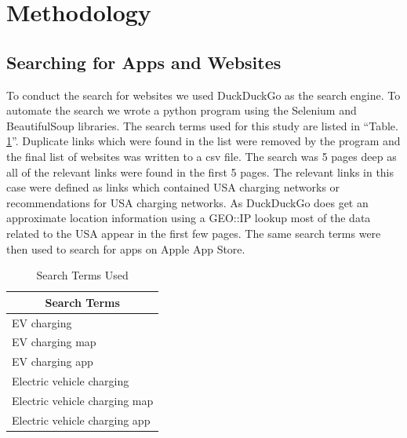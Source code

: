\documentclass[conference]{IEEEtran}
\begin{document}
\section{Methodology}

\subsection{Searching for Apps and Websites}
To conduct the search for websites we used DuckDuckGo as the search engine. To automate the search we wrote a python program using the Selenium and BeautifulSoup libraries. The search terms used for this study are listed in ``Table. \ref{tab0}''. Duplicate links which were found in the list were removed by the program and the final list of websites was written to a csv file. The search was 5 pages deep as all of the relevant links were found in the first 5 pages. The relevant links in this case were defined as links which contained USA charging networks or recommendations for USA charging networks. As DuckDuckGo does get an approximate location information using a GEO::IP lookup most of the data related to the USA appear in the first few pages. The same search terms were then used to search for apps on Apple App Store.

\begin{table}[htbp]
\caption{Search Terms Used}
\begin{center}
\begin{tabular}{|l|}
\hline
\multicolumn{1}{|c|}{\textbf{Search Terms}} \\
\hline
EV charging\\
EV charging map\\
EV charging app\\
Electric vehicle charging\\
Electric vehicle charging map\\
Electric vehicle charging app\\
\hline
\end{tabular}
\label{tab0}
\end{center}
\end{table}
\end{document}
